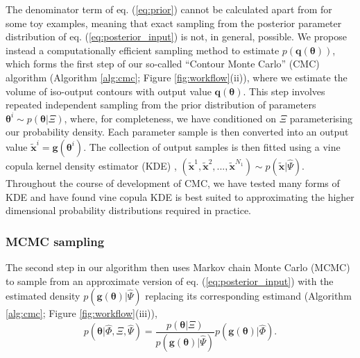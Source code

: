The denominator term of eq. (\ref{eq:prior}) cannot be calculated apart from for some toy examples, meaning that exact sampling from the posterior parameter distribution of eq. (\ref{eq:posterior_input}) is not, in general, possible. We propose instead a computationally efficient sampling method to estimate $p(\boldsymbol{q}(\boldsymbol{\theta}))$, which forms the first step of our so-called ``Contour Monte Carlo'' (CMC) algorithm (Algorithm \ref{alg:cmc}; Figure \ref{fig:workflow}(ii)), where we estimate the volume of iso-output contours with output value $\boldsymbol{q}(\boldsymbol{\theta})$. This step involves repeated independent sampling from the prior distribution of parameters $\boldsymbol{\theta}^i\sim p(\boldsymbol{\theta}|\Xi)$, where, for completeness, we have conditioned on $\Xi$ parameterising our probability density. Each parameter sample is then converted into an output value $\tilde{\boldsymbol{x}}^i=\boldsymbol{g}(\boldsymbol{\theta}^i)$. The collection of output samples is then fitted using a vine copula kernel density estimator (KDE) \cite{nagler2016evading}, $(\tilde{\boldsymbol{x}}^1,\tilde{\boldsymbol{x}}^2,...,\tilde{\boldsymbol{x}}^{N_1})\sim p(\tilde{\boldsymbol{x}}|\hat{\Psi})$. Throughout the course of development of CMC, we have tested many forms of KDE and have found vine copula KDE is best suited to approximating the higher dimensional probability distributions required in practice.


\subsubsection{MCMC sampling}

The second step in our algorithm then uses Markov chain Monte Carlo (MCMC) to sample from an approximate version of eq. (\ref{eq:posterior_input}) with the estimated density $p(\boldsymbol{g}(\boldsymbol{\theta})|\hat{\Psi})$ replacing its corresponding estimand (Algorithm \ref{alg:cmc}; Figure \ref{fig:workflow}(iii)),
%
\begin{equation}\label{eq:posterior_input_estimated}
p(\boldsymbol{\theta}|\hat{\Phi},\Xi,\hat{\Psi}) = \frac{p(\boldsymbol{\theta}|\Xi)}{p(\boldsymbol{g}(\boldsymbol{\theta})|\hat{\Psi})} p(\boldsymbol{g}(\boldsymbol{\theta})|\hat{\Phi}).
\end{equation}
%

